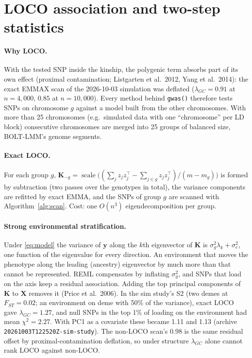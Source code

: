 \documentclass[11pt]{article}
\newcommand{\y}{\mathbf{y}}
\newcommand{\K}{\mathbf{K}}
\newcommand{\X}{\mathbf{X}}
\begin{document}
\section{LOCO association and two-step statistics}
\label{sec:twostep}

\paragraph{Why LOCO.} With the tested SNP inside the kinship, the
polygenic term absorbs part of its own effect (proximal contamination;
Listgarten et al.\ 2012, Yang et al.\ 2014): the exact EMMAX scan of the
2026-10-03 simulation was deflated ($\lambda_{GC} = 0.91$ at $n = 4{,}000$,
$0.85$ at $n = 10{,}000$). Every method behind \texttt{gwas()} therefore
tests SNPs on chromosome $g$ against a model built from the other
chromosomes. With more than 25 chromosomes (e.g.\ simulated data with one
``chromosome'' per LD block) consecutive chromosomes are merged into 25
groups of balanced size, BOLT-LMM's genome segments.

\paragraph{Exact LOCO.} For each group $g$,
$\K_{-g} = \operatorname{scale}\big((\sum_j z_jz_j^\top - \sum_{j\in g}z_jz_j^\top)/(m-m_g)\big)$
is formed by subtraction (two passes over the genotypes in total), the
variance components are refitted by exact EMMA, and the SNPs of group
$g$ are scanned with Algorithm~\ref{alg:scan}. Cost: one $O(n^3)$
eigendecomposition per group.

\paragraph{Strong environmental stratification.} Under
\eqref{eq:model} the variance of $\y$ along the $k$th eigenvector of
$\K$ is $\sigma_g^2\lambda_k + \sigma_e^2$, one function of the eigenvalue
for every direction. An environment that moves the phenotype along the
leading (ancestry) eigenvector by much more than that cannot be
represented. REML compensates by inflating $\sigma_g^2$, and SNPs that
load on the axis keep a residual association. Adding the top principal
components of $\K$ to $\X$ removes it (Price et al.\ 2006). In the sim
study's S2 (two demes at $F_{ST} = 0.02$; an environment on deme with 50\%
of the variance), exact LOCO gave $\lambda_{GC} = 1.27$, and null SNPs in
the top 1\% of loading on the environment had mean $\chi^2 = 2.27$. With
PC1 as a covariate these became 1.11 and 1.13 (archive
\texttt{20261003T122520Z-sim-study}). The non-LOCO scan's 0.98 is the
same residual offset by proximal-contamination deflation, so under
structure $\lambda_{GC}$ alone cannot rank LOCO against non-LOCO.
\end{document}
